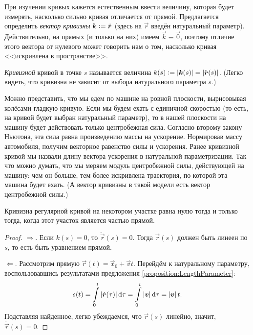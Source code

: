 
При изучении кривых кажется естественным ввести величину, которая будет измерять, насколько сильно кривая отличается от прямой. Предлагается определить \textit{вектор кривизны} $\vec{k} \vcentcolon = \ddot{\vec{r}}$ (здесь на $\vec{r}$ введён натуральный параметр). Действительно, на прямых (и только на них) имеем $\vec{k} \equiv \vec{0}$, поэтому отличие этого вектора от нулевого может говорить нам о том, насколько кривая <<искривлена в пространстве>>.

\begin{definition}
	\textit{Кривизной} кривой в точке $s$ называется величина $k(s) \vcentcolon = \abs{\vec{k}(s)} = \abs{\ddot{\vec{r}}(s)}$. (Легко видеть, что кривизна не зависит от выбора натурального параметра $s$.)
\end{definition}

Можно представить, что мы едем по машине на ровной плоскости, вырисовывая колёсами гладкую кривую. Если мы будем ехать с единичной скоростью (то есть, на кривой будет выбран натуральный параметр), то в нашей плоскости на машину будет действовать только центробежная сила. Согласно второму закону Ньютона, эта сила равна произведению массы на ускорение. Нормировав массу автомобиля, получим векторное равенство силы и ускорения. Ранее кривизной кривой мы назвали длину вектора ускорения в натуральной параметризации. Так что можно думать, что мы меряем модуль центробежной силы, действующей на машину: чем он больше, тем более искривлена траектория, по которой эта машина будет ехать. (А вектор кривизны в такой модели есть вектор центробежной силы.)

\begin{proposition}
	Кривизна регулярной кривой на некотором участке равна нулю тогда и только тогда, когда этот участок является частью прямой.
\end{proposition}

\begin{proof}
	$\Rightarrow$. Если $k(s) = 0$, то $\ddot{\vec{r}}(s) = 0$. Тогда $\vec{r}(s)$ должен быть линеен по $s$, то есть быть уравнением прямой.

	$\Leftarrow$. Рассмотрим прямую $\vec{r}(t) = \vec{x}_0 + \vec{v}t$. Перейдём к натуральному параметру, воспользовавшись результатами предложения \ref{proposition:LengthParameter}:
	\[
		s(t) = \int\limits_0^t\abs{\dot{\vec{r}}(\tau)}\d\tau = \int\limits_0^t \abs{\vec{v}}\d\tau = \abs{\vec{v}}t.
	\]
	Подставляя найденное, легко убеждаемся, что $\vec{r}(s)$ линейно, значит, $\ddot{\vec{r}}(s) = 0$.
\end{proof}

